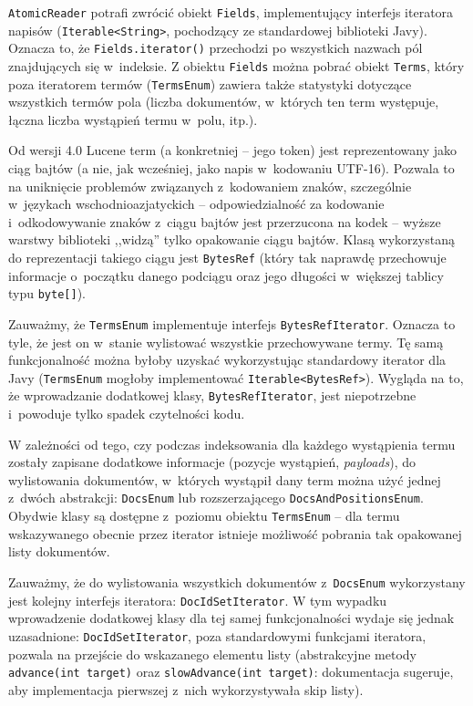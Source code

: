 \texttt{AtomicReader} potrafi zwrócić obiekt \texttt{Fields}, implementujący interfejs iteratora napisów (\texttt{Iterable<String>}, pochodzący ze standardowej biblioteki Javy). Oznacza to, że \texttt{Fields.iterator()} przechodzi po wszystkich nazwach pól znajdujących się w~indeksie. Z obiektu \texttt{Fields} można pobrać obiekt \texttt{Terms}, który poza iteratorem termów (\texttt{TermsEnum}) zawiera także statystyki dotyczące wszystkich termów pola (liczba dokumentów, w~których ten term występuje, łączna liczba wystąpień termu w~polu, itp.).

Od wersji 4.0 Lucene term (a konkretniej -- jego token) jest reprezentowany jako ciąg bajtów (a nie, jak wcześniej, jako napis w~kodowaniu UTF-16). Pozwala to na uniknięcie problemów związanych z~kodowaniem znaków, szczególnie w~językach wschodnioazjatyckich -- odpowiedzialność za kodowanie i~odkodowywanie znaków z~ciągu bajtów jest przerzucona na kodek -- wyższe warstwy biblioteki ,,widzą'' tylko opakowanie ciągu bajtów. Klasą wykorzystaną do reprezentacji takiego ciągu jest \texttt{BytesRef} (który tak naprawdę przechowuje informacje o~początku danego podciągu oraz jego długości w~większej tablicy typu \texttt{byte[]}).

Zauważmy, że \texttt{TermsEnum} implementuje interfejs \texttt{BytesRefIterator}. Oznacza to tyle, że jest on w~stanie wylistować wszystkie przechowywane termy. Tę samą funkcjonalność można byłoby uzyskać wykorzystując standardowy iterator dla Javy (\texttt{TermsEnum} mogłoby implementować \texttt{Iterable<BytesRef>}). Wygląda na to, że wprowadzanie dodatkowej klasy, \texttt{BytesRefIterator}, jest niepotrzebne i~powoduje tylko spadek czytelności kodu.

W zależności od tego, czy podczas indeksowania dla każdego wystąpienia termu zostały zapisane dodatkowe informacje (pozycje wystąpień, \emph{payloads}), do wylistowania dokumentów, w~których wystąpił dany term można użyć jednej z~dwóch abstrakcji: \texttt{DocsEnum} lub rozszerzającego \texttt{DocsAndPositionsEnum}. Obydwie klasy są dostępne z~poziomu obiektu \texttt{TermsEnum} -- dla termu wskazywanego obecnie przez iterator istnieje możliwość pobrania tak opakowanej listy dokumentów.

Zauważmy, że do wylistowania wszystkich dokumentów z~\texttt{DocsEnum} wykorzystany jest kolejny interfejs iteratora: \texttt{DocIdSetIterator}. W tym wypadku wprowadzenie dodatkowej klasy dla tej samej funkcjonalności wydaje się jednak uzasadnione: \texttt{DocIdSetIterator}, poza standardowymi funkcjami iteratora, pozwala na przejście do wskazanego elementu listy (abstrakcyjne metody \texttt{advance(int target)} oraz \texttt{slowAdvance(int target)}: dokumentacja sugeruje, aby implementacja pierwszej z~nich wykorzystywała skip listy).

